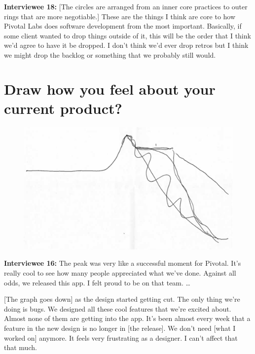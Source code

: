 \textbf{Interviewee 18:} [The circles are arranged from an inner core practices to outer rings that are more negotiable.] These are the things I think are core to how Pivotal Labs does software development from the most important.  Basically, if some client wanted to drop things outside of it, this will be the order that I think we'd agree to have it be dropped.  I don't think we'd ever drop retros but I think we might drop the backlog or something that we probably still would.

\section{Draw how you feel about your current product?}

\begin{figure}[H]
\centering
\includegraphics[width=6.5in]{interviews/drawings/2016_01_08_designer2.png}
\caption{}
\end{figure}

\textbf{Interviewee 16:} The peak  was very like a successful moment for Pivotal. It's really cool to see how many people appreciated what we've done. Against all odds, we released this app. I felt proud to be on that team. \ldots 

[The graph goes down] as the design started getting cut. The only thing we're doing is bugs. We designed all these cool features that we're excited about. Almost none of them are getting into the app. It's been almost every week that a feature in the new design is no longer in [the release]. We don't need [what I worked on] anymore.  It feels very frustrating as a designer. I can't affect that that much.

